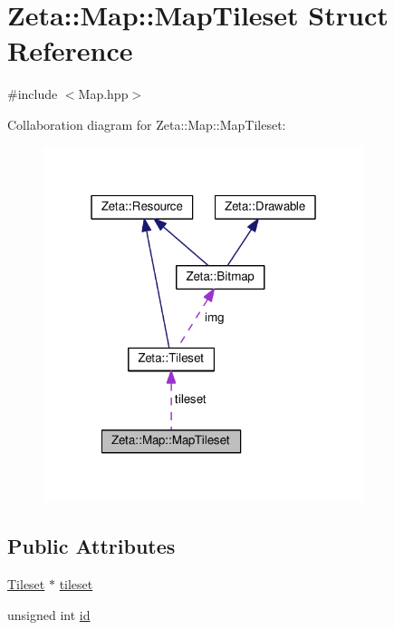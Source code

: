 \hypertarget{structZeta_1_1Map_1_1MapTileset}{\section{Zeta\+:\+:Map\+:\+:Map\+Tileset Struct Reference}
\label{structZeta_1_1Map_1_1MapTileset}
}


{\ttfamily \#include $<$Map.\+hpp$>$}



Collaboration diagram for Zeta\+:\+:Map\+:\+:Map\+Tileset\+:\nopagebreak
\begin{figure}[H]
\begin{center}
\leavevmode
\includegraphics[width=265pt]{structZeta_1_1Map_1_1MapTileset__coll__graph}
\end{center}
\end{figure}
\subsection*{Public Attributes}
\begin{DoxyCompactItemize}
\item 
\hyperlink{classZeta_1_1Tileset}{Tileset} $\ast$ \hyperlink{structZeta_1_1Map_1_1MapTileset_a36dd1867bb6d3c2e35567c22bfc23f1b}{tileset}
\item 
unsigned int \hyperlink{structZeta_1_1Map_1_1MapTileset_ae4c1d0dd4b98d9cefd633593fb0a0207}{id}
\end{DoxyCompactItemize}


